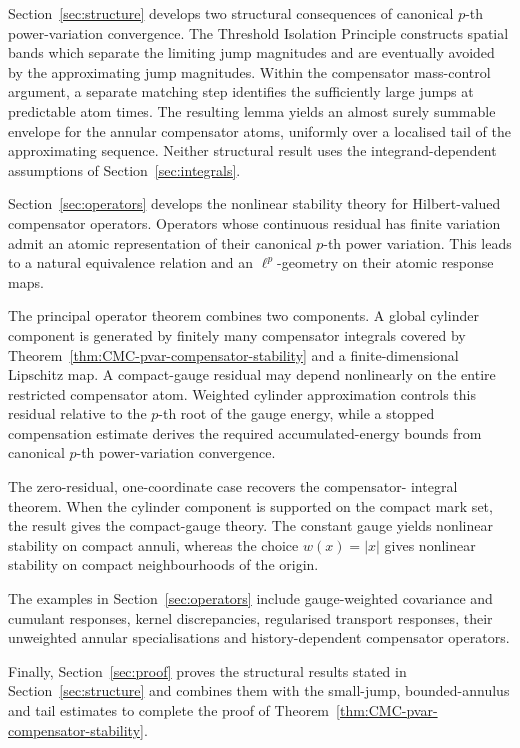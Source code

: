 \documentclass[a4paper,10pt]{article}
\begin{document}
Section~\ref{sec:structure} develops two structural consequences of
canonical \(p\)-th power-variation convergence. The Threshold
Isolation Principle constructs spatial bands which separate the
limiting jump magnitudes and are eventually avoided by the
approximating jump magnitudes. Within the compensator mass-control
argument, a separate matching step identifies the sufficiently large
jumps at predictable atom times. The resulting lemma yields an almost
surely summable envelope for the annular compensator atoms, uniformly
over a localised tail of the approximating sequence. Neither
structural result uses the integrand-dependent assumptions of
Section~\ref{sec:integrals}.


Section~\ref{sec:operators} develops the nonlinear stability theory
for Hilbert-valued compensator operators. Operators whose continuous
residual has finite variation admit an atomic representation of their
canonical \(p\)-th power variation. This leads to a natural
equivalence relation and an \(\ell^p\)-geometry on their atomic
response maps.

The principal operator theorem combines two components. A global
cylinder component is generated by finitely many compensator integrals
covered by Theorem~\ref{thm:CMC-pvar-compensator-stability} and a
finite-dimensional Lipschitz map. A compact-gauge residual may depend
nonlinearly on the entire restricted compensator atom. Weighted
cylinder approximation controls this residual relative to the
\(p\)-th root of the gauge energy, while a stopped compensation
estimate derives the required accumulated-energy bounds from
canonical \(p\)-th power-variation convergence.

The zero-residual, one-coordinate case recovers the compensator-
integral theorem. When the cylinder component is supported on the
compact mark set, the result gives the compact-gauge theory. The
constant gauge yields nonlinear stability on compact annuli, whereas
the choice \(w(x)=|x|\) gives nonlinear stability on compact
neighbourhoods of the origin.

The examples in Section~\ref{sec:operators} include gauge-weighted
covariance and cumulant responses, kernel discrepancies, regularised
transport responses, their unweighted annular specialisations and
history-dependent compensator operators.

Finally, Section~\ref{sec:proof} proves the structural results stated
in Section~\ref{sec:structure} and combines them with the small-jump,
bounded-annulus and tail estimates to complete the proof of
Theorem~\ref{thm:CMC-pvar-compensator-stability}.
\end{document}

